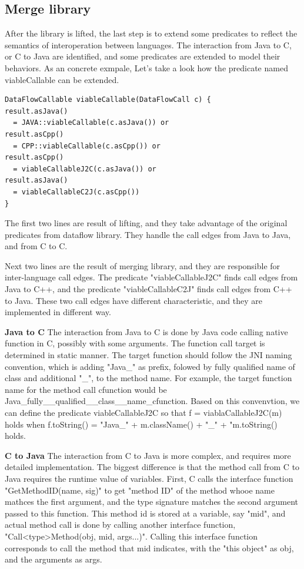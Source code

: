 \subsection{Merge library}

After the library is lifted, the last step is to extend some predicates to
reflect the semantics of interoperation between languages. The interaction from
Java to C, or C to Java are identified, and some predicates are extended to
model their behaviors. As an concrete exmpale, Let's take a look how the predicate
named viableCallable can be extended.
\begin{lstlisting}[style=codeql,xleftmargin=2.5em]
DataFlowCallable viableCallable(DataFlowCall c) {
result.asJava()
  = JAVA::viableCallable(c.asJava()) or
result.asCpp()
  = CPP::viableCallable(c.asCpp()) or
result.asCpp()
  = viableCallableJ2C(c.asJava()) or
result.asJava()
  = viableCallableC2J(c.asCpp())
}
\end{lstlisting}
The first two lines are result of lifting, and they take advantage of the
original predicates from dataflow library.  They handle the call edges from
Java to Java, and from C to C.

Next two lines are the result of merging library, and they are responsible for
inter-language call edges.  The predicate "viableCallableJ2C" finds call edges
from Java to C++, and the predicate "viableCallableC2J" finds call edges from
C++ to Java. These two call edges have different characteristic, and they
are implemented in different way.

\textbf{Java to C} The interaction from Java to C is done by Java code
calling native function in C, possibly with some arguments. The function
call target is determined in static manner. The target function should
follow the JNI naming convention, which is adding "Java\_" as prefix, 
folowed by fully qualified name of class and additional "\_", to the
method name. For example, the target function name for the method call
cfunction would be Java\_fully\_\_qualified\_\_class\_\_name\_cfunction.
Based on this convenvtion, we can define the predicate viableCallableJ2C
so that f = viablaCallableJ2C(m) holds when f.toString() = "Java\_" + 
m.className() + "\_" + "m.toString() holds. 

\textbf{C to Java} The interaction from C to Java is more complex, and
requires more detailed implementation. The biggest difference is that
the method call from C to Java requires the runtime value of variables.
First, C calls the interface function "GetMethodID(name, sig)" to get "method
ID" of the method whooe name mathces the first argument, and the type signature
matches the second argument passed to this function. This method id is stored
at a variable, say "mid", and actual method call is done by calling another
interface function, "Call<type>Method(obj, mid, args...)". Calling this interface
function corresponds to call the method that mid indicates, with the "this object" as
obj, and the arguments as args.

